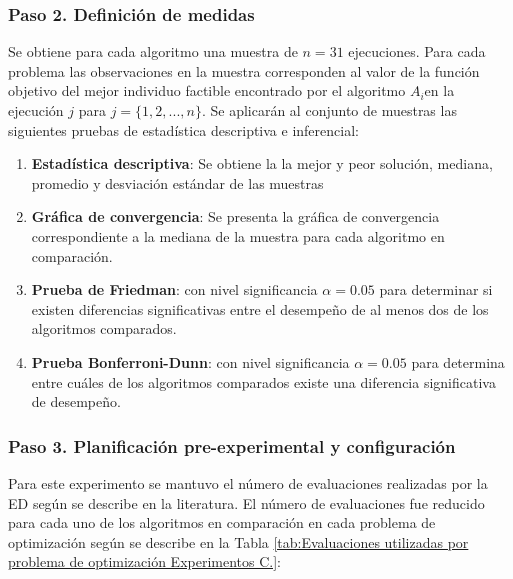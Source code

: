 \subsubsection{Paso 2. Definición de medidas}
Se obtiene para cada algoritmo una muestra de $n=31$ ejecuciones. Para cada problema las observaciones en la muestra corresponden al valor de la función objetivo del mejor individuo factible encontrado por el algoritmo $A_i$en la ejecución $j$ para $j= \{ 1,2,...,n\}$. Se aplicarán al conjunto de muestras las siguientes pruebas de estadística descriptiva e inferencial:
\begin{enumerate}

		\item \textbf{Estadística descriptiva}: Se obtiene la la mejor y peor solución, mediana, promedio y desviación estándar de las muestras
		\item \textbf{Gráfica de convergencia}: Se presenta la gráfica de convergencia correspondiente a la mediana de la muestra para cada algoritmo en comparación.
		\item \textbf{Prueba de Friedman}: con nivel significancia $\alpha=0.05$ para determinar si existen diferencias significativas entre el desempeño de al menos dos de los algoritmos comparados. 
		\item \textbf{Prueba Bonferroni-Dunn}: con nivel significancia $\alpha=0.05$ para determina entre cuáles de los algoritmos comparados existe una diferencia significativa de desempeño.

\end{enumerate}
\subsubsection{Paso 3. Planificación pre-experimental y configuración}
Para este experimento se mantuvo el número de evaluaciones realizadas por la ED según se describe en la literatura. El número de evaluaciones fue reducido para cada uno de los algoritmos en comparación en cada problema de optimización según se describe en la Tabla \ref{tab:Evaluaciones utilizadas por problema de optimización Experimentos C.}:

